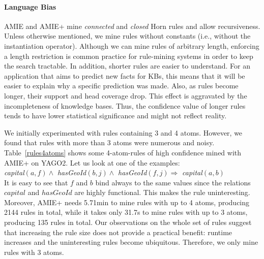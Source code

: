 \paragraph{Language Bias}
AMIE and AMIE+ mine \emph{connected} and \emph{closed} Horn rules and allow recursiveness.
Unless otherwise mentioned, we mine rules without constants (i.e., without the instantiation operator).
Although we can mine rules of arbitrary length, enforcing a length restriction is common practice for rule-mining systems in order to keep the search tractable.
In addition, shorter rules are easier to understand. For an application that aims to predict new facts for KBs,
this means that it will be easier to explain why a specific prediction was made.
Also, as rules become longer, their support and head coverage drop. This effect is aggravated
by the incompleteness of knowledge bases. Thus, the confidence value of
longer rules tends to have lower statistical significance and might not reflect reality.

We initially experimented with rules containing 3 and 4 atoms. However, we found that rules with more than 3 atoms were numerous and noisy.
Table~\ref{rules4atoms} shows some 4-atom-rules of high confidence mined with AMIE+ on YAGO2.
 Let us look at one of the examples: \\

{\small \raggedleft \emph{capital}$(a,f) \wedge$ \emph{hasGeoId}$(b,j) \wedge$ \emph{hasGeoId}$(f,j) \Rightarrow$ \emph{capital}$(a,b)$} \\

\noindent It is easy to see that $f$ and $b$ bind always to the same values since the relations $capital$ and
$hasGeoId$ are
highly functional. This makes the rule uninteresting. Moreover, AMIE+ needs 5.71min to mine rules with up to 4 atoms, producing 2144 rules in total,
while it takes only 31.7s to mine rules with up to 3 atoms, producing 135 rules in total.
Our observations on the whole set of rules
suggest that increasing the rule size does not provide a practical benefit: runtime increases and the uninteresting rules become ubiquitous.
Therefore, we only mine rules with 3 atoms.

